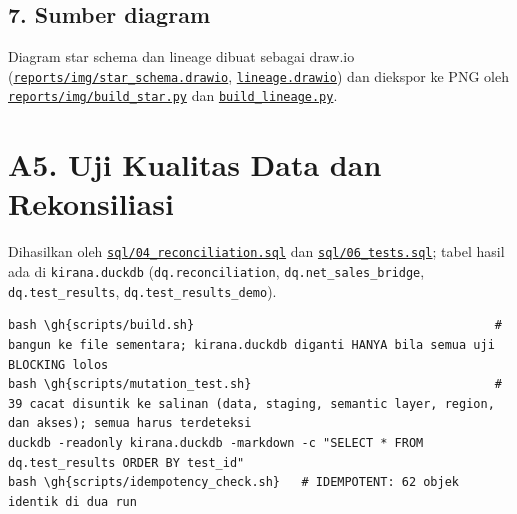 \documentclass[10pt,a4paper]{article}
\newcommand{\gh}[1]{\href{https://github.com/titan2903/kirana-omnichannel-performance-intelligence/blob/master/#1}{#1}}  %
\begin{document}
\subsection{7. Sumber diagram}\label{sumber-diagram}

Diagram star schema dan lineage dibuat sebagai draw.io (\href{https://github.com/titan2903/kirana-omnichannel-performance-intelligence/blob/master/reports/img/star_schema.drawio}{\texttt{reports/img/star\_\allowbreak{}schema.drawio}}, \href{https://github.com/titan2903/kirana-omnichannel-performance-intelligence/blob/master/reports/img/lineage.drawio}{\texttt{lineage.drawio}}) dan diekspor ke PNG oleh \href{https://github.com/titan2903/kirana-omnichannel-performance-intelligence/blob/master/reports/img/build_star.py}{\texttt{reports/img/build\_\allowbreak{}star.py}} dan \href{https://github.com/titan2903/kirana-omnichannel-performance-intelligence/blob/master/reports/img/build_lineage.py}{\texttt{build\_\allowbreak{}lineage.py}}.

\section{A5. Uji Kualitas Data dan Rekonsiliasi}\label{a5.-uji-kualitas-data-dan-rekonsiliasi}

Dihasilkan oleh \href{https://github.com/titan2903/kirana-omnichannel-performance-intelligence/blob/master/sql/04_reconciliation.sql}{\texttt{sql/04\_\allowbreak{}reconciliation.sql}} dan \href{https://github.com/titan2903/kirana-omnichannel-performance-intelligence/blob/master/sql/06_tests.sql}{\texttt{sql/06\_\allowbreak{}tests.sql}}; tabel hasil ada di \texttt{kirana.duckdb}
(\texttt{dq.reconciliation}, \texttt{dq.net\_\allowbreak{}sales\_\allowbreak{}bridge}, \texttt{dq.test\_\allowbreak{}results}, \texttt{dq.test\_\allowbreak{}results\_\allowbreak{}demo}).

\begin{Verbatim}[commandchars=\\\{\},breaklines,fontsize=\scriptsize]
bash \gh{scripts/build.sh}                                          # bangun ke file sementara; kirana.duckdb diganti HANYA bila semua uji BLOCKING lolos
bash \gh{scripts/mutation_test.sh}                                  # 39 cacat disuntik ke salinan (data, staging, semantic layer, region, dan akses); semua harus terdeteksi
duckdb -readonly kirana.duckdb -markdown -c "SELECT * FROM dq.test_results ORDER BY test_id"
bash \gh{scripts/idempotency_check.sh}   # IDEMPOTENT: 62 objek identik di dua run
\end{Verbatim}
\end{document}
